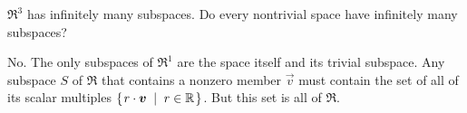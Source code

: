

\begin{Exercise}[
name={},
title={}, 
difficulty=0,
origin={\cite{JH}}]
$\Re^3$ has infinitely many subspaces.
Do every nontrivial space have infinitely many subspaces?
\end{Exercise}

\begin{Answer}
 No.
      The only subspaces of \( \Re^1 \) are the space itself and its 
      trivial subspace.
      Any subspace $S$ of $\Re$ that contains a nonzero member $\vec{v}$ 
      must contain the set of all of its scalar multiples 
      $\mbox{$\left\{\hspace{0.1em}r\cdot\bm{v}\;\;\middle|\;\; r\in\mathbb{R}\hspace{0.1em}\right\}$}$. 
      But this set is all of $\Re$.  


\end{Answer}
